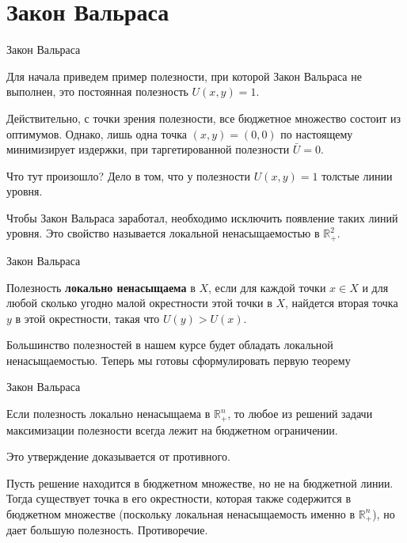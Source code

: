 \documentclass{beamer}
\begin{document}
\section{Закон Вальраса}

\begin{frame}{Закон Вальраса}

Для начала приведем пример полезности, при которой Закон Вальраса не выполнен, это постоянная полезность $U(x,y) = 1$. 

Действительно, с точки зрения полезности, все бюджетное множество состоит из оптимумов. Однако, лишь одна точка $(x,y)=(0,0)$ по настоящему минимизирует издержки, при таргетированной полезности $\bar U = 0$. 

Что тут произошло? Дело в том, что у полезности $U(x,y) = 1$ толстые линии уровня. 

Чтобы Закон Вальраса заработал, необходимо исключить появление таких линий уровня. Это свойство называется локальной ненасыщаемостью в $\mathbb{R}^2_{+}$.

\end{frame}

\begin{frame}{Закон Вальраса}

\begin{definition}
Полезность \textbf{локально ненасыщаема} в $X$, если для каждой точки $x \in X$ и для любой сколько угодно малой окрестности этой точки в $X$, найдется вторая точка $y$ в этой окрестности, такая что $U(y)>U(x)$.
\end{definition}

Большинство полезностей в нашем курсе будет обладать локальной ненасыщаемостью. Теперь мы готовы сформулировать первую теорему

\end{frame}

\begin{frame}{Закон Вальраса}

\begin{theorem}
Если полезность локально ненасыщаема в $\mathbb{R}^n_{+}$, то любое из решений задачи максимизации полезности всегда лежит на бюджетном ограничении.
\end{theorem}

Это утверждение доказывается от противного. 

Пусть решение находится в бюджетном множестве, но не на бюджетной линии. Тогда существует точка в его окрестности, которая также содержится в бюджетном множестве (поскольку локальная ненасыщаемость именно в $\mathbb{R}^n_{+}$), но дает большую полезность. Противоречие.

\end{frame}
\end{document}
